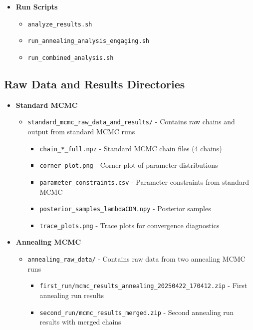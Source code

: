 \documentclass[11pt]{article}
\begin{document}
\begin{itemize}
    \item \textbf{Run Scripts}
    \begin{itemize}
        \item \texttt{analyze\_results.sh}
        \item \texttt{run\_annealing\_analysis\_engaging.sh}
        \item \texttt{run\_combined\_analysis.sh}
    \end{itemize}
\end{itemize}

\subsection{Raw Data and Results Directories}

\begin{itemize}
    \item \textbf{Standard MCMC}
    \begin{itemize}
        \item \texttt{standard\_mcmc\_raw\_data\_and\_results/} - Contains raw chains and output from standard MCMC runs
        \begin{itemize}
            \item \texttt{chain\_*\_full.npz} - Standard MCMC chain files (4 chains)
            \item \texttt{corner\_plot.png} - Corner plot of parameter distributions
            \item \texttt{parameter\_constraints.csv} - Parameter constraints from standard MCMC
            \item \texttt{posterior\_samples\_lambdaCDM.npy} - Posterior samples
            \item \texttt{trace\_plots.png} - Trace plots for convergence diagnostics
        \end{itemize}
    \end{itemize}
    
    \item \textbf{Annealing MCMC}
    \begin{itemize}
        \item \texttt{annealing\_raw\_data/} - Contains raw data from two annealing MCMC runs
        \begin{itemize}
            \item \texttt{first\_run/mcmc\_results\_annealing\_20250422\_170412.zip} - First annealing run results
            \item \texttt{second\_run/mcmc\_results\_merged.zip} - Second annealing run results with merged chains
        \end{itemize}
    \end{itemize}
\end{itemize}
\end{document}
